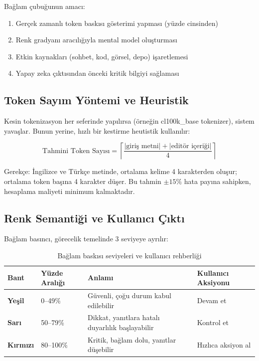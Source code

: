 \documentclass[12pt,a4paper]{article}
\begin{document}
Bağlam çubuğunun amacı:
\begin{enumerate}[leftmargin=*]
  \item Gerçek zamanlı token baskısı gösterimi yapması (yüzde cinsinden)
  \item Renk gradyanı aracılığıyla mental model oluşturması
  \item Etkin kaynakları (sohbet, kod, görsel, depo) işaretlemesi
  \item Yapay zeka çıktısından önceki kritik bilgiyi sağlaması
\end{enumerate}

\subsection{Token Sayım Yöntemi ve Heuristik}

Kesin tokenizasyon her seferinde yapılırsa (örneğin cl100k\_base tokenizer), sistem yavaşlar. Bunun yerine, hızlı bir kestirme heutistik kullanılır:

$$
\text{Tahmini Token Sayısı} = \left\lceil \frac{|\text{giriş metni}| + |\text{editör içeriği}|}{4} \right\rceil
$$

Gerekçe: İngilizce ve Türkçe metinde, ortalama kelime 4 karakterden oluşur; ortalama token başına 4 karakter düşer. Bu tahmin $\pm 15\%$ hata payına sahipken, hesaplama maliyeti minimum kalmaktadır.

\subsection{Renk Semantiği ve Kullanıcı Çıktı}

Bağlam basıncı, görecelik temelinde 3 seviyeye ayrılır:

\begin{table}[h!]
  \centering\small
  \begin{tabular}{@{} P{2cm} P{2.5cm} P{5cm} P{3.5cm} @{}}
    \toprule
    Bant & Yüzde Aralığı & Anlamı & Kullanıcı Aksiyonu \\
    \midrule
    \textbf{Yeşil} & 0--49\% & Güvenli, çoğu durum kabul edilebilir & Devam et \\
    \textbf{Sarı} & 50--79\% & Dikkat, yanıtlara hatalı duyarlılık başlayabilir & Kontrol et \\
    \textbf{Kırmızı} & 80--100\% & Kritik, bağlam dolu, yanıtlar düşebilir & Hızlıca aksiyon al \\
    \bottomrule
  \end{tabular}
  \caption{Bağlam baskısı seviyeleri ve kullanıcı rehberliği}
\end{table}
\end{document}

